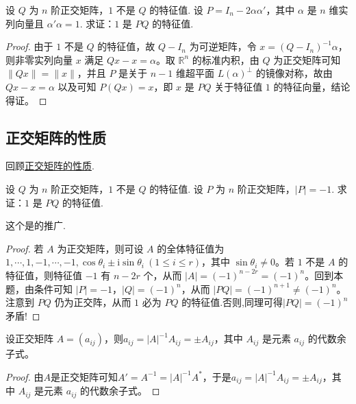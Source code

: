 \documentclass[../../main.tex]{subfiles}
\begin{document}
\begin{proposition}\label{proposition:例9.44}
设 \(Q\) 为 \(n\) 阶正交矩阵，\(1\) 不是 \(Q\) 的特征值. 设 \(P = I_n - 2\alpha\alpha'\)，其中 \(\alpha\) 是 \(n\) 维实列向量且 \(\alpha'\alpha = 1\). 求证：\(1\) 是 \(PQ\) 的特征值.
\end{proposition}
\begin{proof}
由于 \(1\) 不是 \(Q\) 的特征值，故 \(Q - I_n\) 为可逆矩阵，令 \(x = (Q - I_n)^{-1}\alpha\)，则非零实列向量 \(x\) 满足 \(Qx - x = \alpha\)。取 \(\mathbb{R}^n\) 的标准内积，由 \(Q\) 为正交矩阵可知 \(\|Qx\| = \|x\|\)，并且 \(P\) 是关于 \(n - 1\) 维超平面 \(L(\alpha)^{\perp}\) 的镜像对称，故由 \(Qx - x = \alpha\) 以及可知 \(P(Qx) = x\)，即 \(x\) 是 \(PQ\) 关于特征值 \(1\) 的特征向量，结论得证。

\end{proof}


\subsection{正交矩阵的性质}

回顾\hyperref[theorem:正交矩阵的基本性质1]{正交矩阵的性质}.

\begin{proposition}\label{proposition:例9.44的推广}
设 \(Q\) 为 \(n\) 阶正交矩阵，\(1\) 不是 \(Q\) 的特征值. 设 \(P\) 为 \(n\) 阶正交矩阵，\(\vert P\vert = - 1\). 求证：\(1\) 是 \(PQ\) 的特征值.
\end{proposition}
\begin{remark}
这个是的推广.
\end{remark}
\begin{proof}
若 \(A\) 为正交矩阵，则可设 \(A\) 的全体特征值为 \(1,\cdots,1,-1,\cdots,-1,\cos\theta_i\pm\mathrm{i}\sin\theta_i\ (1\leqslant  i \leqslant  r)\)，其中 \(\sin\theta_i\neq0\)。若 \(1\) 不是 \(A\) 的特征值，则特征值 \(-1\) 有 \(n - 2r\) 个，从而 \(\vert A\vert = (-1)^{n - 2r}=(-1)^n\)。回到本题，由条件可知 \(\vert P\vert = - 1\)，\(\vert Q\vert = (-1)^n\)，从而 \(\vert PQ\vert = (-1)^{n + 1}\neq(-1)^n\)。注意到 \(PQ\) 仍为正交阵，从而 \(1\) 必为 \(PQ\) 的特征值.否则,同理可得$|PQ|=(-1)^n$矛盾!

\end{proof}

\begin{proposition}\label{proposition:正交阵元素的性质}
设正交矩阵 \(A = (a_{ij})\)，则\(a_{ij} = \vert A\vert^{-1}A_{ij} = \pm A_{ij}\)，其中 \(A_{ij}\) 是元素 \(a_{ij}\) 的代数余子式。
\end{proposition}
\begin{proof}
由$A$是正交矩阵可知\(A' = A^{-1} = \vert A\vert^{-1}A^*\)，于是\(a_{ij} = \vert A\vert^{-1}A_{ij} = \pm A_{ij}\)，其中 \(A_{ij}\) 是元素 \(a_{ij}\) 的代数余子式。

\end{proof}
\end{document}
